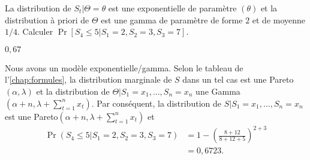 \begin{exercice}
  La distribution de $S_t|\Theta = \theta$ est une exponentielle de
  paramètre $(\theta)$ et la distribution à priori de $\Theta$ est une
  gamma de paramètre de forme $2$ et de moyenne $1/4$. Calculer
  $\Pr[S_4 \leq 5|S_1 = 2, S_2 = 3, S_3 = 7]$.
  \begin{rep}
    $0,67$
  \end{rep}
  \begin{sol}
    Nous avons un modèle exponentielle/gamma. Selon le tableau de
    l'\autoref{chap:formules}, la distribution marginale de $S$ dans
    un tel cas est une Pareto$(\alpha, \lambda)$ et la distribution de
    $\Theta|S_1 = x_1, \dots, S_n = x_n$ une
    Gamma$(\alpha + n, \lambda + \sum_{t = 1}^n x_t)$. Par conséquent,
    la distribution de $S|S_1 = x_1, \dots, S_n = x_n$ est une
    Pareto$(\alpha + n, \lambda + \sum_{t = 1}^n x_t)$ et
    \begin{align*}
      \Pr(S_4 \leq 5|S_1 = 2, S_2 = 3, S_3 = 7)
      &= 1 - \left( \frac{8 + 12}{8 + 12 + 5} \right)^{2 + 3} \\
      &= 0,6723.
    \end{align*}
  \end{sol}
\end{exercice}


